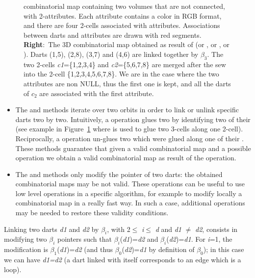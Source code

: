 \begin{figure}
{    combinatorial map containing two volumes that are not connected,
    with 2-attributes. Each attribute contains a color in RGB format,
    and there are four 2-cells associated with attributes.
    Associations between darts and attributes are drawn with red
    segments. \textbf{Right}:~The 3D combinatorial map obtained as
    result of  (or , or
    , or ). Darts (1,5), (2,8),
    (3,7) and (4,6) are linked together by $\beta_3$. The two 2-cells
    \emph{c1}=\{1,2,3,4\} and \emph{c2}=\{5,6,7,8\} are merged after the sew
    into the 2-cell \{1,2,3,4,5,6,7,8\}. We are in the case where
    the two attributes are non NULL, thus the first one is kept, and
    all the darts of $c_2$ are associated with the first attribute.}
  \label{fig-exemple-sew}
\end{figure}
\begin{itemize}
\item The  and  methods iterate over two orbits in
  order to link or unlink specific darts two by two.  Intuitively, a
   operation glues two  by identifying two of
  their  (see example in Figure~\ref{fig-exemple-sew}
  where  is used to glue two 3-cells along one 2-cell).
  Reciprocally, a  operation un-glues two  which
  were glued along one of their .
  These methods guarantee that given a valid combinatorial map and a
  possible operation we obtain a valid combinatorial map as result of
  the operation.

\item
\begin{ccAdvanced}
The  and  methods only modify
  the pointer of two darts: the obtained combinatorial maps may be not
  valid. These operations can be useful to use low level operations
  in a specific algorithm, for example to modify locally a
  combinatorial map in a really fast way. In such a case, additional
  operations may be needed to restore these validity conditions.
\end{ccAdvanced}
\end{itemize}

Linking two darts \emph{d1} and \emph{d2} by $\beta_i$, with 2$\leq$ \emph{i}$\leq$ \emph{d}
and \emph{d1} $\neq$ \emph{d2}, consists in modifying two $\beta_i$ pointers such that
$\beta_i$(\emph{d1})=\emph{d2} and $\beta_i$(\emph{d2})=\emph{d1}. For \emph{i}=1, the modification
is $\beta_1$(\emph{d1})=\emph{d2} (and thus $\beta_0$(\emph{d2})=\emph{d1} by definition of
$\beta_0$); in this case we can have \emph{d1=d2} (a dart linked with
itself corresponds to an edge which is a loop).

